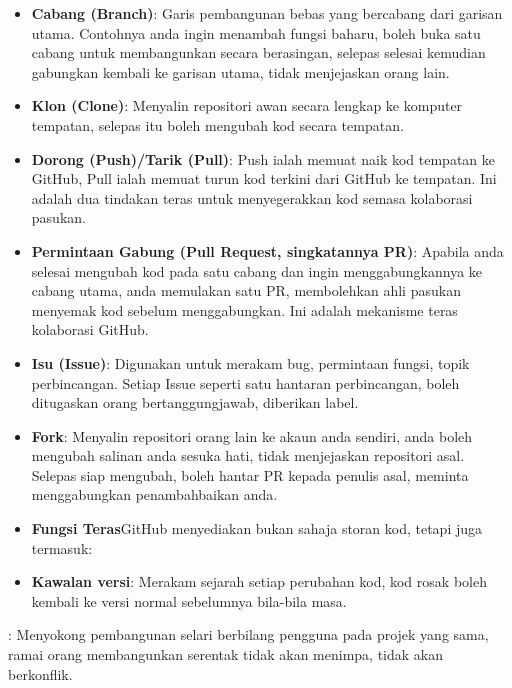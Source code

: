 \begin{itemize}
  \item \textbf{Cabang (Branch)}: Garis pembangunan bebas yang bercabang dari garisan utama. Contohnya anda ingin menambah fungsi baharu, boleh buka satu cabang untuk membangunkan secara berasingan, selepas selesai kemudian gabungkan kembali ke garisan utama, tidak menjejaskan orang lain.
  \item \textbf{Klon (Clone)}: Menyalin repositori awan secara lengkap ke komputer tempatan, selepas itu boleh mengubah kod secara tempatan.
  \item \textbf{Dorong (Push)/Tarik (Pull)}: Push ialah memuat naik kod tempatan ke GitHub, Pull ialah memuat turun kod terkini dari GitHub ke tempatan. Ini adalah dua tindakan teras untuk menyegerakkan kod semasa kolaborasi pasukan.
  \item \textbf{Permintaan Gabung (Pull Request, singkatannya PR)}: Apabila anda selesai mengubah kod pada satu cabang dan ingin menggabungkannya ke cabang utama, anda memulakan satu PR, membolehkan ahli pasukan menyemak kod sebelum menggabungkan. Ini adalah mekanisme teras kolaborasi GitHub.
  \item \textbf{Isu (Issue)}: Digunakan untuk merakam bug, permintaan fungsi, topik perbincangan. Setiap Issue seperti satu hantaran perbincangan, boleh ditugaskan orang bertanggungjawab, diberikan label.
  \item \textbf{Fork}: Menyalin repositori orang lain ke akaun anda sendiri, anda boleh mengubah salinan anda sesuka hati, tidak menjejaskan repositori asal. Selepas siap mengubah, boleh hantar PR kepada penulis asal, meminta menggabungkan penambahbaikan anda.
  \item \textbf{Fungsi Teras}GitHub menyediakan bukan sahaja storan kod, tetapi juga termasuk:
  \item \textbf{Kawalan versi}: Merakam sejarah setiap perubahan kod, kod rosak boleh kembali ke versi normal sebelumnya bila-bila masa.
\end{itemize}


: Menyokong pembangunan selari berbilang pengguna pada projek yang sama, ramai orang membangunkan serentak tidak akan menimpa, tidak akan berkonflik.

